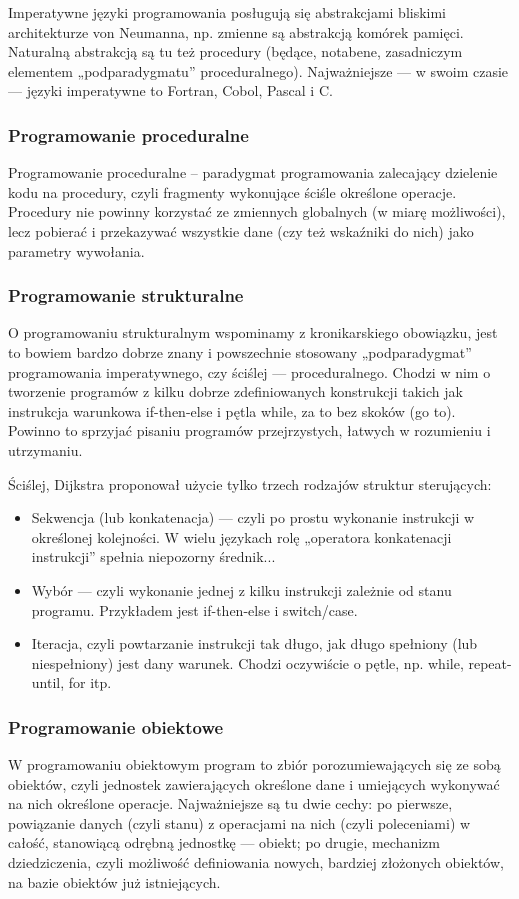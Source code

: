 \documentclass[a4paper,12pt,oneside]{book}
\begin{document}
				Imperatywne języki programowania posługują się abstrakcjami bliskimi architekturze von Neumanna, np. zmienne są abstrakcją komórek pamięci. Naturalną abstrakcją są tu też procedury (będące, notabene, zasadniczym elementem „podparadygmatu” proceduralnego). Najważniejsze — w swoim czasie — języki imperatywne to Fortran, Cobol, Pascal i C.
				
				\subsubsection{Programowanie proceduralne}
				Programowanie proceduralne – paradygmat programowania zalecający dzielenie kodu na procedury, czyli fragmenty wykonujące ściśle określone operacje. Procedury nie powinny korzystać ze zmiennych globalnych (w miarę możliwości), lecz pobierać i przekazywać wszystkie dane (czy też wskaźniki do nich) jako parametry wywołania.
				
				\subsubsection{Programowanie strukturalne}
				O programowaniu strukturalnym wspominamy z kronikarskiego obowiązku, jest to bowiem bardzo dobrze znany i powszechnie stosowany „podparadygmat” programowania imperatywnego, czy ściślej — proceduralnego. Chodzi w nim o tworzenie programów z kilku dobrze zdefiniowanych konstrukcji takich jak instrukcja warunkowa if-then-else i pętla while, za to bez skoków (go to). Powinno to sprzyjać pisaniu programów przejrzystych, łatwych w rozumieniu i utrzymaniu.
				
				Ściślej, Dijkstra proponował użycie tylko trzech rodzajów struktur sterujących:
				\begin{itemize}
					\item Sekwencja (lub konkatenacja) — czyli po prostu wykonanie instrukcji w określonej kolejności. W wielu językach rolę „operatora konkatenacji instrukcji” spełnia niepozorny średnik...
					\item Wybór — czyli wykonanie jednej z kilku instrukcji zależnie od stanu programu. Przykładem jest if-then-else i switch/case.
					\item Iteracja, czyli powtarzanie instrukcji tak długo, jak długo spełniony (lub niespełniony) jest dany warunek. Chodzi oczywiście o pętle, np. while, repeat-until, for itp.
				\end{itemize}
			
			
				\subsubsection{Programowanie obiektowe}
				W programowaniu obiektowym program to zbiór porozumiewających się ze sobą obiektów, czyli jednostek zawierających określone dane i umiejących wykonywać na nich określone operacje. Najważniejsze są tu dwie cechy: po pierwsze, powiązanie danych (czyli stanu) z operacjami na nich (czyli poleceniami) w całość, stanowiącą odrębną jednostkę — obiekt; po drugie, mechanizm dziedziczenia, czyli możliwość definiowania nowych, bardziej złożonych obiektów, na bazie obiektów już istniejących.
				
\end{document}
